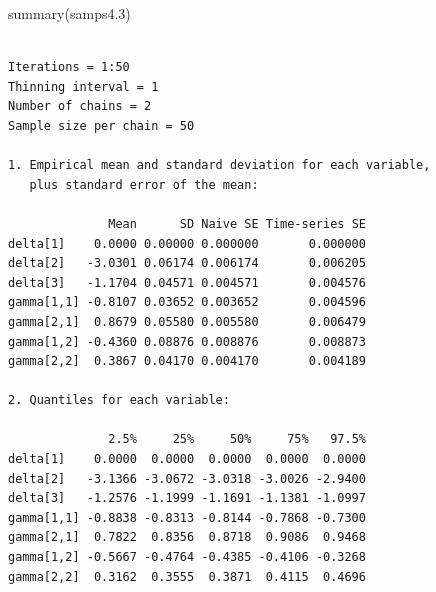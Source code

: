 \documentclass[
  letterpaper,
  DIV=11,
  numbers=noendperiod]{scrreprt}
\newenvironment{Shaded}{\begin{snugshade}}{\end{snugshade}}
\newcommand{\CommentTok}[1]{\textcolor[rgb]{0.37,0.37,0.37}{#1}}
\newcommand{\DecValTok}[1]{\textcolor[rgb]{0.68,0.00,0.00}{#1}}
\newcommand{\FloatTok}[1]{\textcolor[rgb]{0.68,0.00,0.00}{#1}}
\newcommand{\FunctionTok}[1]{\textcolor[rgb]{0.28,0.35,0.67}{#1}}
\newcommand{\NormalTok}[1]{\textcolor[rgb]{0.00,0.23,0.31}{#1}}
\newcommand{\OtherTok}[1]{\textcolor[rgb]{0.00,0.23,0.31}{#1}}
\newcommand{\SpecialCharTok}[1]{\textcolor[rgb]{0.37,0.37,0.37}{#1}}
\begin{document}
\begin{Shaded}
\begin{Highlighting}[]
\FunctionTok{summary}\NormalTok{(samps4}\FloatTok{.3}\NormalTok{)}
\end{Highlighting}
\end{Shaded}

\begin{verbatim}

Iterations = 1:50
Thinning interval = 1 
Number of chains = 2 
Sample size per chain = 50 

1. Empirical mean and standard deviation for each variable,
   plus standard error of the mean:

              Mean      SD Naive SE Time-series SE
delta[1]    0.0000 0.00000 0.000000       0.000000
delta[2]   -3.0301 0.06174 0.006174       0.006205
delta[3]   -1.1704 0.04571 0.004571       0.004576
gamma[1,1] -0.8107 0.03652 0.003652       0.004596
gamma[2,1]  0.8679 0.05580 0.005580       0.006479
gamma[1,2] -0.4360 0.08876 0.008876       0.008873
gamma[2,2]  0.3867 0.04170 0.004170       0.004189

2. Quantiles for each variable:

              2.5%     25%     50%     75%   97.5%
delta[1]    0.0000  0.0000  0.0000  0.0000  0.0000
delta[2]   -3.1366 -3.0672 -3.0318 -3.0026 -2.9400
delta[3]   -1.2576 -1.1999 -1.1691 -1.1381 -1.0997
gamma[1,1] -0.8838 -0.8313 -0.8144 -0.7868 -0.7300
gamma[2,1]  0.7822  0.8356  0.8718  0.9086  0.9468
gamma[1,2] -0.5667 -0.4764 -0.4385 -0.4106 -0.3268
gamma[2,2]  0.3162  0.3555  0.3871  0.4115  0.4696
\end{verbatim}

\begin{Shaded}
\end{Shaded}
\end{document}
